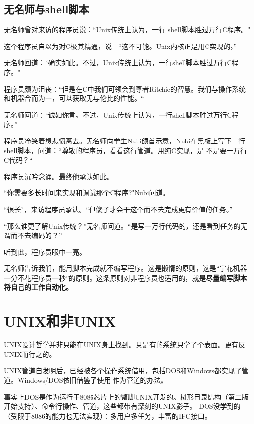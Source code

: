 \begin{insertnote}
\subsection*{无名师与shell脚本}

无名师曾对来访的程序员说：“Unix传统上认为，一行 shell脚本胜过万行C程序。" 

这个程序员自以为对C极其精通，说：“这不可能。Unix内核正是用C实现的。” 

无名师回道：“确实如此。不过，Unix传统上认为，一行shell脚本胜过万行C程序。" 

程序员颇为沮丧：“但是在C中我们可领会到尊者Ritchie的智慧。我们与操作系统和机器合而为一，可以获取无与伦比的性能。“ 

无名师回道：“诚如你言。不过，Unix传统上认为，一行shell脚本胜过万行C程序。” 

程序员冷笑着想悲愤离去。无名师向学生Nabi颌首示意，Nubi在黑板上写下一行shell脚本，问道：“尊敬的程序员，看看这行管道。用纯C实现，是 不是要一万行C代码？“ 

程序员沉吟念诵。最终他承认如此。 

“你需要多长时间来实现和调试那个C程序?"Nubi问道。 

“很长”，来访程序员承认。“但傻子才会干这个而不去完成更有价值的任务。” 

“那么谁更了解Unix传统？”无名师问道。“是写一万行代码的，还是看到任务的无谓而不去编码的？” 

听到此，程序员眼中一亮。
\end{insertnote}

无名师告诉我们，能用脚本完成就不编写程序。这是懒惰的原则，这是“宁花机器一分不花程序员一秒”的原则。这条原则对非程序员也适用的，就是\textbf{尽量编写脚本将自己的工作自动化。}


\section{UNIX和非UNIX}
UNIX设计哲学并非只能在UNIX身上找到。只是有的系统只学了个表面。更有反UNIX而行之的。

UNIX管道自发明后，已经被各个操作系统借用，包括DOS和Windows都实现了管道。Windows/DOS依旧借鉴了使用|作为管道的办法。
\par\begin{notice}
事实上DOS是作为运行于8086芯片上的蹩脚UNIX开发的。树形目录结构（第二版开始支持）、命令行操作、管道，这些都带有深刻的UNIX影子。
DOS没学到的（受限于8086的能力也无法实现）：多用户多任务，丰富的IPC接口。
\end{notice}

